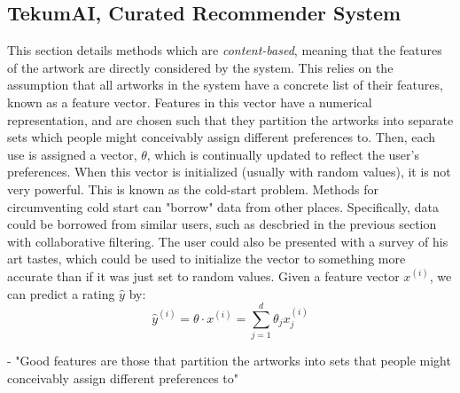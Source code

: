 \documentclass[fontsize=12pt]{scrartcl} %
\numberwithin{equation}{section} %
\numberwithin{figure}{section} %
\numberwithin{table}{section} %
\begin{document}
\subsection{TekumAI, Curated Recommender System}
 This section details methods which are \textit{content-based}, meaning that the features of the artwork are directly considered by the system. This relies on the assumption that all artworks in the system have a concrete list of their features, known as a feature vector. Features in this vector have a numerical representation, and are chosen such that they partition the artworks into separate sets which people might conceivably assign different preferences to. Then, each use is assigned a vector, $\theta$, which is continually updated to reflect the user's preferences. When this vector is initialized (usually with random values), it is not very powerful. This is known as the cold-start problem. Methods for circumventing cold start can "borrow" data from other places. Specifically, data could be borrowed from similar users, such as descbried in the previous section with collaborative filtering. The user could also be presented with a survey of his art tastes, which could be used to initialize the vector to something more accurate than if it was just set to random values. Given a feature vector $x^{(i)}$, we can predict a rating $\hat{y}$ by:
 $$ \hat{y}^{(i)} = \theta \cdot x^{(i)} = \sum_{j=1}^d \theta_jx^{(i)}_j $$


- "Good features are those that partition the artworks into sets that people might
conceivably assign different preferences to"
\end{document}
